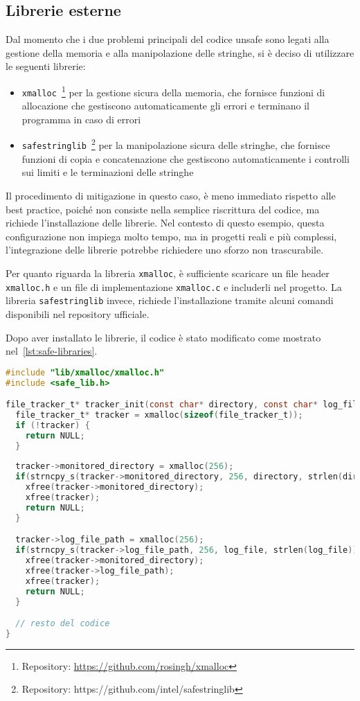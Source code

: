 \subsection*{Librerie esterne}
\label{sec:librerie-case-study}

Dal momento che i due problemi principali del codice unsafe sono legati alla gestione
della memoria e alla manipolazione delle stringhe, si è deciso di utilizzare le
seguenti librerie:
\begin{itemize}
  \item \texttt{xmalloc}~\footnote{Repository: \url{https://github.com/rosingh/xmalloc}}
    per la gestione sicura della memoria, che fornisce funzioni di allocazione che
    gestiscono automaticamente gli errori e terminano il programma in caso di errori

  \item \texttt{safestringlib}~\footnote{Repository: https://github.com/intel/safestringlib}
    per la manipolazione sicura delle stringhe, che fornisce funzioni di copia e
    concatenazione che gestiscono automaticamente i controlli sui limiti e le terminazioni
    delle stringhe
\end{itemize}

Il procedimento di mitigazione in questo caso, è meno immediato rispetto alle best
practice, poiché non consiste nella semplice riscrittura del codice, ma richiede
l'installazione delle librerie. Nel contesto di questo esempio, questa configurazione
non impiega molto tempo, ma in progetti reali e più complessi, l'integrazione delle
librerie potrebbe richiedere uno sforzo non trascurabile.

Per quanto riguarda la libreria \texttt{xmalloc}, è sufficiente scaricare un file
header \texttt{xmalloc.h} e un file di implementazione \texttt{xmalloc.c} e includerli
nel progetto. La libreria \texttt{safestringlib} invece, richiede l'installazione
tramite alcuni comandi disponibili nel repository ufficiale.

Dopo aver installato le librerie, il codice è stato modificato come mostrato nel~\autoref{lst:safe-libraries}.
\begin{lstlisting}[language=C, caption={Codice mitigato (librerie)}, label={lst:safe-libraries}, style=changes_in_c]
#include "lib/xmalloc/xmalloc.h"
#include <safe_lib.h>

file_tracker_t* tracker_init(const char* directory, const char* log_file) {
  file_tracker_t* tracker = xmalloc(sizeof(file_tracker_t));
  if (!tracker) {
    return NULL;
  }
  
  tracker->monitored_directory = xmalloc(256);
  if(strncpy_s(tracker->monitored_directory, 256, directory, strlen(directory)) != EOK){
    xfree(tracker->monitored_directory);
    xfree(tracker);
    return NULL;
  }

  tracker->log_file_path = xmalloc(256);
  if(strncpy_s(tracker->log_file_path, 256, log_file, strlen(log_file)) != EOK){
    xfree(tracker->monitored_directory);
    xfree(tracker->log_file_path);
    xfree(tracker);
    return NULL;
  }

  // resto del codice
}
\end{lstlisting}

